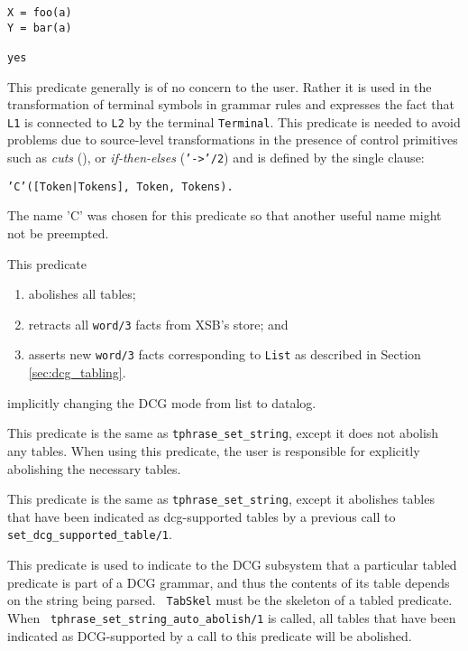 \begin{description}
\begin{verbatim}
X = foo(a)
Y = bar(a)

yes
\end{verbatim}




This predicate generally is of no concern to the user.  Rather it is used 
    in the transformation of terminal symbols in 
    grammar rules and expresses the fact that {\tt L1} is connected 
    to {\tt L2} by the terminal {\tt Terminal}. This predicate is
    needed to avoid problems due to source-level
    transformations in the presence of control primitives such as
    {\em cuts} (\cut), or {\em if-then-elses} 
    ({\tt '->'/2}) and is defined by the single clause:
    \begin{center}
                {\tt 'C'([Token|Tokens], Token, Tokens).}
    \end{center}
    The name 'C' was chosen for this predicate so that another useful
    name might not be preempted.

This predicate 

\begin{enumerate}
\item abolishes all tables;
\item retracts all {\tt word/3} facts from XSB's store; and
\item asserts new {\tt word/3} facts corresponding to {\tt List} as
described in Section \ref{sec:dcg_tabling}.
\end{enumerate}

\noindent
implicitly changing the DCG mode from list to datalog.

This predicate is the same as {\tt tphrase\_set\_string}, except
it does not abolish any tables.  When using this predicate, the
user is responsible for explicitly abolishing the necessary tables.

This predicate is the same as {\tt tphrase\_set\_string}, except
it abolishes tables that have been indicated as dcg-supported tables
by a previous call to {\tt set\_dcg\_supported\_table/1}.

This predicate is used to indicate to the DCG subsystem that a
particular tabled predicate is part of a DCG grammar, and thus the
contents of its table depends on the string being parsed.  {\tt
TabSkel} must be the skeleton of a tabled predicate.  When {\tt
tphrase\_set\_string\_auto\_abolish/1} is called, all tables that have
been indicated as DCG-supported by a call to this predicate will be
abolished.


\end{description}
